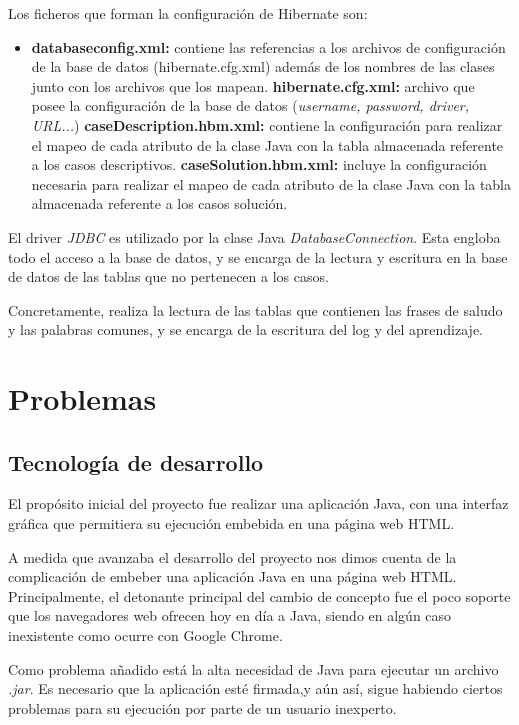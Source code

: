 Los ficheros que forman la configuración de Hibernate son:

\begin{itemize}
\tightlist
\item
\textbf{databaseconfig.xml:} contiene las referencias a los archivos de configuración de la base de datos (hibernate.cfg.xml) además de los nombres de las clases junto con los archivos que los mapean.
\textbf{hibernate.cfg.xml:} archivo que posee la configuración de la base de datos (\emph{username, password, driver, URL...})
\textbf{caseDescription.hbm.xml:} contiene la configuración para realizar el mapeo de cada atributo de la clase Java con la tabla almacenada referente a los casos descriptivos.
\textbf{caseSolution.hbm.xml:} incluye la configuración necesaria para realizar el mapeo de cada atributo de la clase Java con la tabla almacenada referente a los casos solución.
\end{itemize}

El driver \emph{JDBC} es utilizado por la clase Java \emph{DatabaseConnection}. Esta engloba todo el acceso a la base de datos, y se encarga de la lectura y escritura en la base de datos de las tablas que no pertenecen a los casos.

Concretamente, realiza la lectura de las tablas que contienen las frases de saludo y las palabras comunes, y se encarga de la escritura del log y del aprendizaje.


\section{Problemas}\label{problemas}

\subsection{Tecnología de desarrollo}

El propósito inicial del proyecto fue realizar una aplicación Java, con una interfaz gráfica que permitiera su ejecución embebida en una página web HTML.

A medida que avanzaba el desarrollo del proyecto nos dimos cuenta de la complicación de embeber una aplicación Java en una página web HTML. Principalmente, el detonante principal del cambio de concepto fue el poco soporte que los navegadores web ofrecen hoy en día a Java, siendo en algún caso inexistente como ocurre con Google Chrome.

Como problema añadido está la alta necesidad de Java para ejecutar un archivo \emph{.jar}. Es necesario que la aplicación esté firmada,y aún así, sigue habiendo ciertos problemas para su ejecución por parte de un usuario inexperto.

